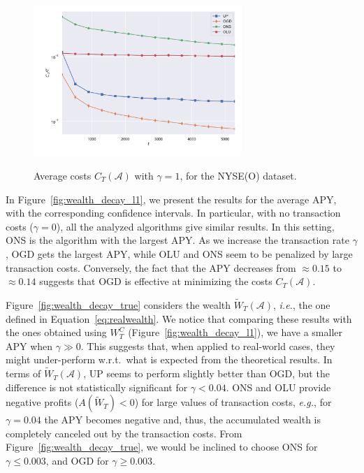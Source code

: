\begin{figure}[ht!]
\centering
{\includegraphics[width=0.70\textwidth,keepaspectratio]{img/fig_costs.pdf}}
\caption{Average costs $C_T(\mathcal{A})$ with $\gamma = 1$, for the NYSE(O) dataset.}
\label{fig:costs}
\end{figure}

In Figure~\ref{fig:wealth_decay_l1}, we present the results for the average APY, with the corresponding confidence intervals.
In particular, with no transaction costs ($\gamma = 0$), all the analyzed algorithms give similar results.
In this setting, ONS is the algorithm with the largest APY.
As we increase the transaction rate $\gamma$, OGD gets the largest APY, while OLU and ONS seem to be penalized by large transaction costs.
Conversely, the fact that the APY decreases from $\approx 0.15$ to $\approx 0.14$ suggests that OGD is effective at minimizing the costs $C_T(\mathcal{A})$.

Figure~\ref{fig:wealth_decay_true} considers the wealth $\tilde{W}_T(\mathcal{A})$, \emph{i.e.}, the one defined in Equation~\eqref{eq:realwealth}.
We notice that comparing these results with the ones obtained using $W_T^C$ (Figure~\ref{fig:wealth_decay_l1}), we have a smaller APY when $\gamma \gg 0$.
This suggests that, when applied to real-world cases, they might under-perform w.r.t.~what is expected from the theoretical results. 
In terms of $\tilde{W}_T(\mathcal{A})$, UP seems to perform slightly better than OGD, but the difference is not statistically significant for $\gamma < 0.04$.
ONS and OLU provide negative profits ($A(\tilde{W}_T) < 0$) for large values of transaction costs, \emph{e.g.}, for $\gamma = 0.04$ the APY becomes negative and, thus, the accumulated wealth is completely canceled out by the transaction costs.
From Figure~\ref{fig:wealth_decay_true}, we would be inclined to choose ONS for $\gamma \leq 0.003$, and OGD for $\gamma \geq 0.003$.

